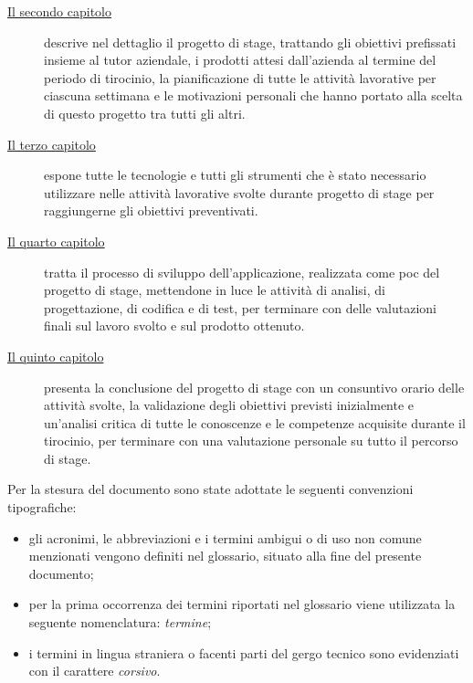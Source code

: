 \begin{description}
	\item[{\hyperref[cap:stage]{Il secondo capitolo}}] descrive nel dettaglio il progetto di stage, trattando gli obiettivi prefissati insieme al tutor aziendale, i prodotti attesi dall'azienda al termine del periodo di tirocinio, la pianificazione di tutte le attività lavorative per ciascuna settimana e le motivazioni personali che hanno portato alla scelta di questo progetto tra tutti gli altri.
	
	\item[{\hyperref[cap:tecnologie-strumenti]{Il terzo capitolo}}] espone tutte le tecnologie e tutti gli strumenti che è stato necessario utilizzare nelle attività lavorative svolte durante progetto di stage per raggiungerne gli obiettivi preventivati.
	
	\item[{\hyperref[cap:applicazione]{Il quarto capitolo}}] tratta il processo di sviluppo dell'applicazione, realizzata come \gls{poc} del progetto di stage, mettendone in luce le attività di analisi, di progettazione, di codifica e di test, per terminare con delle valutazioni finali sul lavoro svolto e sul prodotto ottenuto.
	
	\item[{\hyperref[cap:conclusioni]{Il quinto capitolo}}] presenta la conclusione del progetto di stage con un consuntivo orario delle attività svolte, la validazione degli obiettivi previsti inizialmente e un'analisi critica di tutte le conoscenze e le competenze acquisite durante il tirocinio, per terminare con una valutazione personale su tutto il percorso di stage.
\end{description}

Per la stesura del documento sono state adottate le seguenti convenzioni tipografiche:

\begin{itemize}
	\item gli acronimi, le abbreviazioni e i termini ambigui o di uso non comune menzionati vengono definiti nel glossario, situato alla fine del presente documento;
	\item per la prima occorrenza dei termini riportati nel glossario viene utilizzata la seguente nomenclatura: \emph{termine}\glsfirstoccur;
	\item i termini in lingua straniera o facenti parti del gergo tecnico sono evidenziati con il carattere \emph{corsivo}.
\end{itemize}
